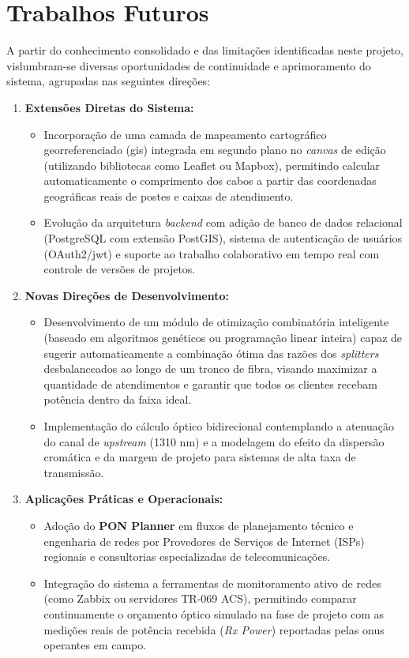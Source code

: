 \section{Trabalhos Futuros}

A partir do conhecimento consolidado e das limitações identificadas neste projeto, vislumbram-se diversas oportunidades de continuidade e aprimoramento do sistema, agrupadas nas seguintes direções:

\begin{enumerate}
    \item \textbf{Extensões Diretas do Sistema:}
    \begin{itemize}
        \item Incorporação de uma camada de mapeamento cartográfico georreferenciado (\gls{gis}) integrada em segundo plano no \textit{canvas} de edição (utilizando bibliotecas como Leaflet ou Mapbox), permitindo calcular automaticamente o comprimento dos cabos a partir das coordenadas geográficas reais de postes e caixas de atendimento.
        \item Evolução da arquitetura \textit{backend} com adição de banco de dados relacional (PostgreSQL com extensão PostGIS), sistema de autenticação de usuários (OAuth2/\gls{jwt}) e suporte ao trabalho colaborativo em tempo real com controle de versões de projetos.
    \end{itemize}
    
    \item \textbf{Novas Direções de Desenvolvimento:}
    \begin{itemize}
        \item Desenvolvimento de um módulo de otimização combinatória inteligente (baseado em algoritmos genéticos ou programação linear inteira) capaz de sugerir automaticamente a combinação ótima das razões dos \textit{splitters} desbalanceados ao longo de um tronco de fibra, visando maximizar a quantidade de atendimentos e garantir que todos os clientes recebam potência dentro da faixa ideal.
        \item Implementação do cálculo óptico bidirecional contemplando a atenuação do canal de \textit{upstream} (1310 nm) e a modelagem do efeito da dispersão cromática e da margem de projeto para sistemas de alta taxa de transmissão.
    \end{itemize}
    
    \item \textbf{Aplicações Práticas e Operacionais:}
    \begin{itemize}
        \item Adoção do \textbf{PON Planner} em fluxos de planejamento técnico e engenharia de redes por Provedores de Serviços de Internet (ISPs) regionais e consultorias especializadas de telecomunicações.
        \item Integração do sistema a ferramentas de monitoramento ativo de redes (como Zabbix ou servidores TR-069 ACS), permitindo comparar continuamente o orçamento óptico simulado na fase de projeto com as medições reais de potência recebida (\textit{Rx Power}) reportadas pelas \glspl{onu} operantes em campo.
    \end{itemize}
    

\end{enumerate}
